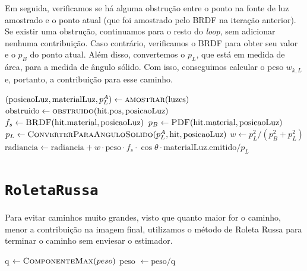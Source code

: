 Em seguida, verificamos se há alguma obstrução entre o ponto na fonte de luz
amostrado e o ponto atual (que foi amostrado pelo BRDF na iteração anterior).
Se existir uma obstrução, continuamos para o resto do \emph{loop}, sem
adicionar nenhuma contribuição. Caso contrário, verificamos o BRDF para obter
seu valor e o $p_B$ do ponto atual. Além disso, convertemos o $p_L$, que está
em medida de área, para a medida de ângulo sólido. Com isso, conseguimos
calcular o peso $w_{k, L}$ e, portanto, a contribuição para esse caminho.

\begin{algorithm}
\caption{Função AmostrarLuz}
\begin{algorithmic}[1]
  \State $(\text{posicaoLuz}, \text{materialLuz},p_L^A) \gets \Call{amostrar}{\text{luzes}}$
  \State $\text{obstruido} \gets \Call{obstruido}{\text{hit.pos}, \text{posicaoLuz}}$
    \State $f_s \gets \Call{BRDF}{\text{hit.material}, \text{posicaoLuz}}$
    \State $p_B \gets \Call{PDF}{\text{hit.material}, \text{posicaoLuz}}$
    \State $p_L \gets \Call{ConverterParaAnguloSolido}{p_L^A, \text{hit}, \text{posicaoLuz}}$
    \State $w \gets p_L^2 / (p_B^2 + p_L^2)$
    \State $\text{radiancia} \gets \text{radiancia} + w \cdot \text{peso} \cdot
      f_s \cdot \cos \theta \cdot \text{materialLuz.emitido} / p_L$
  \EndIf
  \EndFunction
\end{algorithmic}
\end{algorithm}

\section{\texttt{RoletaRussa}}

Para evitar caminhos muito grandes, visto que quanto maior for o caminho, menor a
contribuição na imagem final, utilizamos o método de Roleta Russa
\citep{arvo90} para terminar o caminho sem enviesar o estimador.

\begin{algorithm}
\caption{Função RoletaRussa}
\begin{algorithmic}[1]
    \State q $\gets \Call{ComponenteMax}{peso}$
      \State peso $\gets \text{peso} / \text{q}$
    \EndIf
  \EndIf
  \EndFunction
\end{algorithmic}
\end{algorithm}

